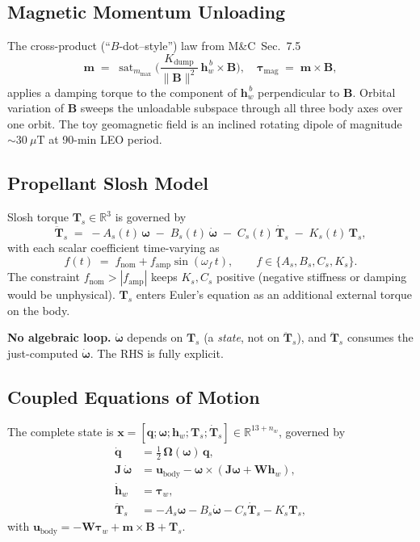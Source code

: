 \subsection{Magnetic Momentum Unloading}

The cross-product (``\(B\)-dot--style'') law from M\&C~Sec.~7.5
\begin{equation}
\bm{m} \;=\; \operatorname{sat}_{m_{\max}}\!\biggl(
\frac{K_{\text{dump}}}{\|\bm{B}\|^{2}}\,
\bm{h}_w^{\,b}\times\bm{B}\biggr),
\quad
\bm{\tau}_{\text{mag}} \;=\; \bm{m}\times\bm{B},
\end{equation}
applies a damping torque to the component of \(\bm{h}_w^{\,b}\)
perpendicular to \(\bm{B}\). Orbital variation of \(\bm{B}\) sweeps the
unloadable subspace through all three body axes over one orbit. The toy
geomagnetic field is an inclined rotating dipole of magnitude
\(\sim 30~\mu\mathrm{T}\) at 90-min LEO period.

\subsection{Propellant Slosh Model}

Slosh torque \(\bm{T}_s \in \mathbb{R}^{3}\) is governed by
\begin{equation}
\ddot{\bm{T}}_s \;=\;
 -A_s(t)\,\bm{\omega}
 \;-\; B_s(t)\,\dot{\bm{\omega}}
 \;-\; C_s(t)\,\dot{\bm{T}}_s
 \;-\; K_s(t)\,\bm{T}_s,
\label{eq:slosh}
\end{equation}
with each scalar coefficient time-varying as
\begin{equation}
f(t) \;=\; f_{\text{nom}} + f_{\text{amp}}\sin(\omega_f\,t),
\qquad f \in \{A_s,B_s,C_s,K_s\}.
\end{equation}
The constraint \(f_{\text{nom}} > |f_{\text{amp}}|\) keeps \(K_s, C_s\)
positive (negative stiffness or damping would be unphysical). \(\bm{T}_s\)
enters Euler's equation as an additional external torque on the body.

\textbf{No algebraic loop.} \(\dot{\bm{\omega}}\) depends on \(\bm{T}_s\) (a
\emph{state}, not on \(\ddot{\bm{T}}_s\)), and \(\ddot{\bm{T}}_s\) consumes
the just-computed \(\dot{\bm{\omega}}\). The RHS is fully explicit.

\subsection{Coupled Equations of Motion}

The complete state is
\(\bm{x} = [\bm{q};\bm{\omega};\bm{h}_w;\bm{T}_s;\dot{\bm{T}}_s]
        \in \mathbb{R}^{13+n_w}\),
governed by
\begin{align}
\dot{\bm{q}}        &= \tfrac{1}{2}\,\bm{\Omega}(\bm{\omega})\,\bm{q}, \\
\bm{J}\,\dot{\bm{\omega}} &= \bm{u}_{\text{body}}
                            - \bm{\omega}\times(\bm{J}\bm{\omega}+\bm{W}\bm{h}_w), \\
\dot{\bm{h}}_w      &= \bm{\tau}_w, \\
\ddot{\bm{T}}_s     &= -A_s\bm{\omega} - B_s\dot{\bm{\omega}}
                       - C_s\dot{\bm{T}}_s - K_s\bm{T}_s,
\end{align}
with
\(\bm{u}_{\text{body}} = -\bm{W}\bm{\tau}_w + \bm{m}\times\bm{B} + \bm{T}_s\).



